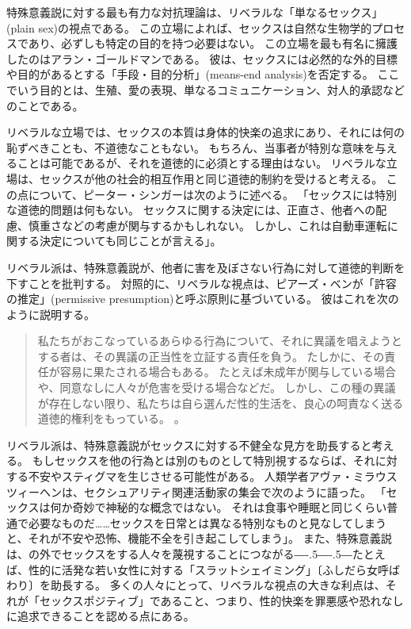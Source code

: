 \documentclass[paper=a4,book,openany]{jlreq}
\newcommand{\ig}[1]{}           %
\def\DDASH{―\kern-.5\zw―\kern-.5\zw―}
\begin{document}
特殊意義説に対する最も有力な対抗理論は、リベラルな「単なるセックス」(plain sex)の視点である。
この立場によれば、セックスは自然な生物学的プロセスであり、必ずしも特定の目的を持つ必要はない。
この立場を最も有名に擁護したのはアラン・ゴールドマンである。
彼は、セックスには必然的な外的目標や目的があるとする「手段・目的分析」(means-end analysis)を否定する。
ここでいう目的とは、生殖、愛の表現、単なるコミュニケーション、対人的承認などのことである\citep{goldman77:_plain_sex}\ig{Alan Goldman}。

リベラルな立場では、セックスの本質は身体的快楽の追求にあり、それには何の恥ずべきことも、不道徳なこともない。
もちろん、当事者が特別な意味を与えることは可能であるが、それを道徳的に必須とする理由はない。
リベラルな立場は、セックスが他の社会的相互作用と同じ道徳的制約を受けると考える。
この点について、ピーター・シンガーは次のように述べる。
「セックスには特別な道徳的問題は何もない。
セックスに関する決定には、正直さ、他者への配慮、慎重さなどの考慮が関与するかもしれない。
しかし、これは自動車運転に関する決定についても同じことが言える」\citep[p.2]{singer79:_pract_ethic}。

リベラル派は、特殊意義説が、他者に害を及ぼさない行為に対して道徳的判断を下すことを批判する。
対照的に、リベラルな視点は、ピアーズ・ベンが「許容の推定」(permissive presumption)と呼ぶ原則に基づいている。
彼はこれを次のように説明する。
\begin{quote}
  私たちがおこなっているあらゆる行為について、それに異議を唱えようとする者は、その異議の正当性を立証する責任を負う。
たしかに、その責任が容易に果たされる場合もある。
たとえば未成年が関与している場合や、同意なしに人々が危害を受ける場合などだ。
しかし、この種の異議が存在しない限り、私たちは自ら選んだ性的生活を、良心の呵責なく送る道徳的権利をもっている。
\citep[p. 237]{benn99:_is_sex_moral_special}。
\end{quote}
リベラル派は、特殊意義説がセックスに対する不健全な見方を助長すると考える。
もしセックスを他の行為とは別のものとして特別視するならば、それに対する不安やスティグマを生じさせる可能性がある。
人類学者アヴァ・ミラウスツィーヘンは、セクシュアリティ関連活動家の集会で次のように語った。
「セックスは何か奇妙で神秘的な概念ではない。
それは食事や睡眠と同じくらい普通で必要なものだ……セックスを日常とは異なる特別なものと見なしてしまうと、それが不安や恐怖、機能不全を引き起こしてしまう」\citep{fein13:_why_sex_is}。
また、特殊意義説は、の外でセックスをする人々を蔑視することにつながる{\DDASH}たとえば、性的に活発な若い女性に対する「スラットシェイミング」〔ふしだら女呼ばわり〕を助長する。
多くの人々にとって、リベラルな視点の大きな利点は、それが「セックスポジティブ」であること、つまり、性的快楽を罪悪感や恐れなしに追求できることを認める点にある。
\end{document}
